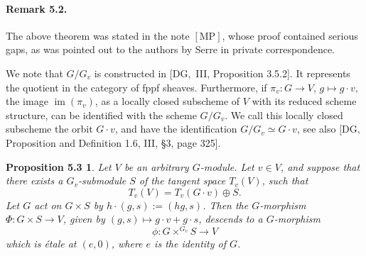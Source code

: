 \documentclass[11pt]{article}
\newtheorem*{proposition53}{Proposition 5.3}
\begin{document}
\paragraph{Remark 5.2.}
The above theorem was stated in the note \([\mathrm{MP}]\), whose proof contained serious
gaps, as was pointed out to the authors by Serre in private correspondence.

We note that \(G/G_v\) is constructed in \([\mathrm{DG},\) III, Proposition 3.5.2]. It
represents the quotient in the category of fppf sheaves. Furthermore, if
\(\pi_v:G\to V\), \(g\mapsto g\cdot v\), the image \(\operatorname{im}(\pi_v)\), as a
locally closed subscheme of \(V\) with its reduced scheme structure, can be identified
with the scheme \(G/G_v\). We call this locally closed subscheme the orbit \(G\cdot v\),
and have the identification \(G/G_v\simeq G\cdot v\), see also \([\mathrm{DG},\)
Proposition and Definition 1.6, III, \S3, page 325].

\begin{proposition53}
Let \(V\) be an arbitrary \(G\)-module. Let \(v\in V\), and suppose that there exists a
\(G_v\)-submodule \(S\) of the tangent space \(T_v(V)\), such that
\[
  T_v(V)=T_v(G\cdot v)\oplus S.
\]
Let \(G\) act on \(G\times S\) by \(h\cdot(g,s):=(h g,s)\). Then the \(G\)-morphism
\(\Phi:G\times S\to V\), given by \((g,s)\mapsto g\cdot v+g\cdot s\), descends to a
\(G\)-morphism
\begin{equation}
  \phi:G\times^{G_v}S\longrightarrow V
  \tag{5.3.1}
\end{equation}
which is étale at \((e,0)\), where \(e\) is the identity of \(G\).
\end{proposition53}
\end{document}
